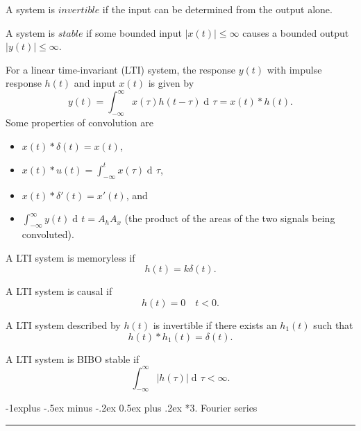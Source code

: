 \documentclass[10pt,letterpaper]{article}
\makeatletter
\DeclareMathOperator{\di}{d\!} %
\newcommand{\abs}[1]{\left| #1 \right|} %
\newcommand{\impulse}{ \delta(t) }
\newcommand{\Iint}{ \int_{-\infty}^{\infty} }
\newcommand{\underlineSection}[1][unnamed]{
\subsection*{#1}
\hrule
\vspace{12pt}
}
\renewcommand{\subsection}{\@startsection{subsection}{2}{0mm}%
                                {-1explus -.5ex minus -.2ex}%
                                {0.5ex plus .2ex}%
                                {\normalfont\normalsize\bfseries}}
\makeatother
\begin{document}
\begin{multicols*}{3}
A system is $invertible$ if the input can be determined from the output alone.

A system is $stable$ if some bounded input $\abs{x(t)} \leq \infty$ causes a bounded output $\abs{y(t)} \leq \infty$.

For a linear time-invariant (LTI) system, the response $y(t)$ with impulse response $h(t)$ and input $x(t)$ is given by
\[ y(t) = \Iint x(\tau) h(t-\tau) \di \tau = x(t)*h(t). \]
Some properties of convolution are
\begin{itemize}[leftmargin=0.5cm]
\item $x(t)*\impulse = x(t)$,
\item $\displaystyle x(t)*u(t) = \int_{-\infty}^t x(\tau) \di\tau$,
\item $x(t)*\delta'(t) = x'(t)$, and
\item $\displaystyle \Iint y(t) \di t = A_h A_x$ (the product of the areas of the two signals being convoluted).
\end{itemize}

A LTI system is memoryless if
\[ h(t) = k\impulse. \]

A LTI system is causal if
\[ h(t) = 0 \quad t < 0. \]

A LTI system described by $h(t)$ is invertible if there exists an $h_1(t)$ such that
\[ h(t)*h_1(t) = \impulse. \]

A LTI system is BIBO stable if
\[ \Iint \abs{h(\tau)} \di\tau < \infty. \]

\underlineSection[3. Fourier series]

\end{multicols*}
\end{document}
